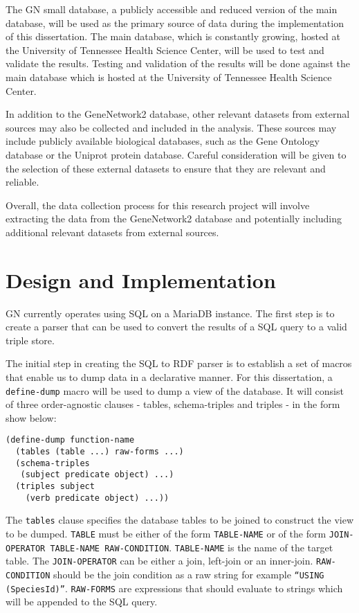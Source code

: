The GN small database, a publicly accessible and reduced version of the main database, will be used as the primary source of data during the implementation of this dissertation.  The main database, which is constantly growing, hosted at the University of Tennessee Health Science Center, will be used to test and validate the results.  Testing and validation of the results will be done against the main database which is hosted at the University of Tennessee Health Science Center.

In addition to the GeneNetwork2 database, other relevant datasets from external sources may also be collected and included in the analysis.  These sources may include publicly available biological databases, such as the Gene Ontology database or the Uniprot protein database.  Careful consideration will be given to the selection of these external datasets to ensure that they are relevant and reliable.

Overall, the data collection process for this research project will involve extracting the data from the GeneNetwork2 database and potentially including additional relevant datasets from external sources.

\section{Design and Implementation}

GN currently operates using SQL on a MariaDB instance.  The first step is to create a parser that can be used to convert the results of a SQL query to a valid triple store.

The initial step in creating the SQL to RDF parser is to establish a set of macros that enable us to dump data in a declarative manner.  For this dissertation, a \texttt{define-dump} macro will be used to dump a view of the database.  It will consist of three order-agnostic clauses - tables, schema-triples and triples - in the form show below:

\begin{verbatim}
(define-dump function-name
  (tables (table ...) raw-forms ...)
  (schema-triples
   (subject predicate object) ...)
  (triples subject
    (verb predicate object) ...))
\end{verbatim}

The \texttt{tables} clause specifies the database tables to be joined to construct the view to be dumped.  \texttt{TABLE} must be either of the form \texttt{TABLE-NAME} or of the form \texttt{JOIN-OPERATOR TABLE-NAME RAW-CONDITION}.  \texttt{TABLE-NAME} is the name of the target table.  The \texttt{JOIN-OPERATOR} can be either a join, left-join or an inner-join.  \texttt{RAW-CONDITION} should be the join condition as a raw string for example \texttt{``USING (SpeciesId)''}.  \texttt{RAW-FORMS} are expressions that should evaluate to strings which will be appended to the SQL query.


